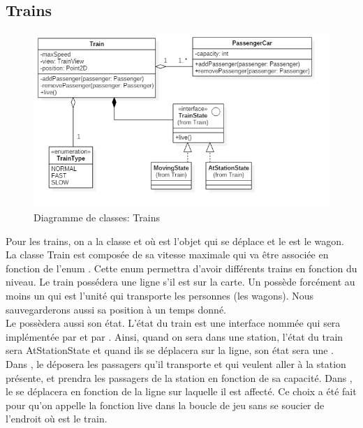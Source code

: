 \documentclass[report, backcover, french, nodocumentinfo]{upmethodology-document}
\begin{document}
			\subsection{Trains}
				\begin{figure}[h!]
					\centering
					\includegraphics[width=1\textwidth]{figures/TrainClassDiagram}
					\caption{Diagramme de classes: Trains}
					\label{fig:TrainClassDiagram}
				\end{figure}
				Pour les trains, on a la classe  et  où  est l'objet qui se déplace et le  est le wagon. La classe Train est composée de sa vitesse maximale qui va être associée en fonction de l'enum  . Cette enum permettra d'avoir différents trains en fonction du niveau. Le train possédera une ligne s'il est sur la carte. Un   possède forcément au moins un   qui est l'unité qui transporte les personnes (les wagons). Nous sauvegarderons aussi sa position à un temps donné.\\
				Le   possèdera aussi son état. L'état du train est une interface nommée  qui sera implémentée par  et par . Ainsi, quand on sera dans une station, l'état du train sera AtStationState et quand ils se déplacera sur la ligne, son état sera une  . Dans , le  déposera les passagers qu'il transporte et qui veulent aller à la station présente, et prendra les passagers de la station en fonction de sa capacité. Dans , le  se déplacera en fonction de la ligne sur laquelle il est affecté. Ce choix a été fait pour qu'on appelle la fonction live dans la boucle de jeu sans se soucier de l'endroit où est le train.
\end{document}

